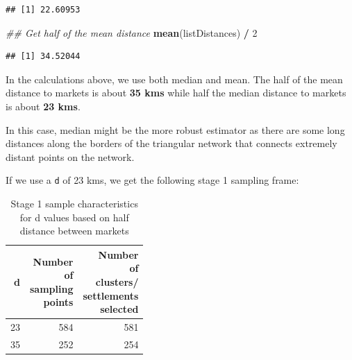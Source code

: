 \documentclass[
  12pt,
  a4paper]{article}
\newenvironment{Shaded}{\begin{snugshade}}{\end{snugshade}}
\newcommand{\CommentTok}[1]{\textcolor[rgb]{0.56,0.35,0.01}{\textit{#1}}}
\newcommand{\DecValTok}[1]{\textcolor[rgb]{0.00,0.00,0.81}{#1}}
\newcommand{\KeywordTok}[1]{\textcolor[rgb]{0.13,0.29,0.53}{\textbf{#1}}}
\newcommand{\NormalTok}[1]{#1}
\newcommand{\OperatorTok}[1]{\textcolor[rgb]{0.81,0.36,0.00}{\textbf{#1}}}
\newcommand{\StringTok}[1]{\textcolor[rgb]{0.31,0.60,0.02}{#1}}
\begin{document}
\begin{verbatim}
## [1] 22.60953
\end{verbatim}

\begin{Shaded}
\begin{Highlighting}[]
\CommentTok{## Get half of the mean distance}
\KeywordTok{mean}\NormalTok{(listDistances) }\OperatorTok{/}\StringTok{ }\DecValTok{2}
\end{Highlighting}
\end{Shaded}

\begin{verbatim}
## [1] 34.52044
\end{verbatim}

In the calculations above, we use both median and mean. The half of the mean distance to markets is about \textbf{35 kms} while half the median distance to markets is about \textbf{23 kms}.

In this case, median might be the more robust estimator as there are some long distances along the borders of the triangular network that connects extremely distant points on the network.

If we use a \texttt{d} of 23 kms, we get the following stage 1 sampling frame:

\begin{table}[H]

\caption{\label{tab:halfdist3}Stage 1 sample characteristics for d values based on half distance between markets}
\centering
\begin{tabular}[t]{rrr}
\toprule
d & \makecell[c]{Number\\of\\sampling\\points} & \makecell[c]{Number\\of\\clusters/\\settlements\\selected}\\
\midrule
\rowcolor{gray!6}  23 & 584 & 581\\
35 & 252 & 254\\
\bottomrule
\end{tabular}
\end{table}
\end{document}
